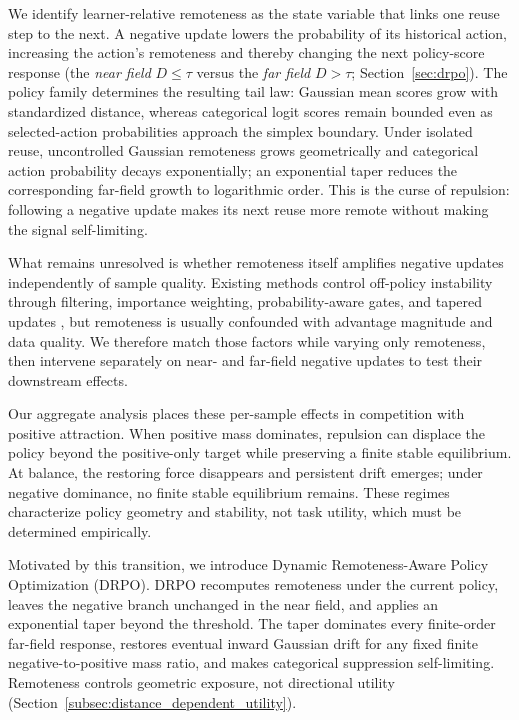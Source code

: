 \documentclass{article}
\theoremstyle{plain}
\theoremstyle{definition}
\theoremstyle{remark}
\begin{document}
We identify learner-relative remoteness as the state variable that links one
reuse step to the next. A negative update lowers the probability of its historical action,
increasing the action's remoteness and thereby changing the next
policy-score response (the \emph{near field} \(D\leq\tau\) versus the
\emph{far field} \(D>\tau\); Section~\ref{sec:drpo}). The policy family determines the resulting tail
law: Gaussian mean scores grow with standardized distance, whereas categorical
logit scores remain bounded even as selected-action probabilities approach the
simplex boundary. Under isolated reuse, uncontrolled Gaussian remoteness grows
geometrically and categorical action probability decays exponentially; an
exponential taper reduces the corresponding far-field growth to logarithmic
order. This is the curse of repulsion: following a negative update makes its next
reuse more remote without making the signal self-limiting.

What remains unresolved is whether remoteness itself amplifies negative
updates independently of sample quality. Existing methods control off-policy
instability through filtering, importance weighting, probability-aware gates,
and tapered updates
\citep{novati2019remember,fakoor2020p3o,peng2019advantage,
schulman2017proximal,fujimoto2019off,kumar2020conservative,
arnal2025asymmetric,leroux2025tapered}, but remoteness is usually confounded
with advantage magnitude and data quality. We therefore match those factors
while varying only remoteness, then intervene separately on near- and far-field
negative updates to test their downstream effects.

Our aggregate analysis places these per-sample effects in competition with
positive attraction. When positive mass dominates, repulsion can displace the
policy beyond the positive-only target while preserving a finite stable
equilibrium. At balance, the restoring force disappears and persistent drift
emerges; under negative dominance, no finite stable equilibrium remains.
These regimes characterize policy geometry and stability, not task utility,
which must be determined empirically.

Motivated by this transition, we introduce Dynamic Remoteness-Aware Policy
Optimization (DRPO). DRPO recomputes remoteness under the current policy,
leaves the negative branch unchanged in the near field, and applies an
exponential taper beyond the threshold. The taper dominates every finite-order
far-field response, restores eventual inward Gaussian drift for any fixed
finite negative-to-positive mass ratio, and makes categorical suppression
self-limiting. Remoteness controls geometric exposure, not directional utility
(Section~\ref{subsec:distance_dependent_utility}).
\end{document}
